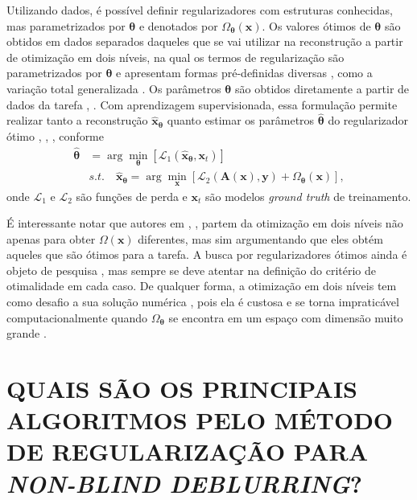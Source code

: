 Utilizando dados, é possível definir regularizadores com estruturas conhecidas, mas parametrizados por $\bm{\theta}$ e denotados por $\Omega_{\bm{\theta}}(\mathbf{x})$. Os valores ótimos de $\bm{\theta}$ são obtidos em dados separados daqueles que se vai utilizar na reconstrução a partir de otimização em dois níveis, na qual os termos de regularização são parametrizados por $\bm{\theta}$ e apresentam formas pré-definidas diversas \cite{Haber2003}, como a variação total generalizada \cite{DelosReyes2016}. Os parâmetros $\bm{\theta}$ são obtidos diretamente a partir de dados da tarefa \cite[pág. 45]{Arridge2019}, \cite{Haber2003}. Com aprendizagem supervisionada, essa formulação permite realizar tanto a reconstrução $\hat{\mathbf{x}}_{\bm{\theta}}$ quanto estimar os parâmetros $\hat{\bm{\theta}}$ do regularizador ótimo \cite[pág. 45-7]{Arridge2019}, \cite{Haber2003}, \cite{DelosReyes2016},  conforme
\begin{equation}
\begin{aligned}
\hat{\bm{\theta}}  & = \arg\min_{\bm{\theta}} \left[\mathcal{L}_1\left( \hat{\mathbf{x}}_{\bm{\theta}}, \mathbf{x}_t \right) \right]\\
& s.t. \quad \hat{\mathbf{x}}_{\bm{\theta}} = \arg\min_{\mathbf{x}} \left[ \mathcal{L}_2(\mathbf{A}(\mathbf{x}),\mathbf{y}) + \Omega_{\bm{\theta}}(\mathbf{x}) \right],
\end{aligned}
\label{eq:learning2}
\end{equation}
onde $ \mathcal{L}_1$ e $ \mathcal{L}_2$ são funções de perda e $\mathbf{x}_t$ são modelos \textit{ground truth} de treinamento. 

É interessante notar que autores em \cite{Haber2003}, \cite{DelosReyes2016}, partem da otimização em dois níveis não apenas para obter $\Omega(\mathbf{x})$ diferentes, mas sim argumentando que eles obtém aqueles que são ótimos para a tarefa. A busca por regularizadores ótimos ainda é objeto de pesquisa \cite{alberti2021learning, DelosReyes2016}, mas sempre se deve atentar na definição do critério de otimalidade em cada caso. De qualquer forma, a otimização em dois níveis tem como desafio a sua solução numérica \cite{Afkham2021}, pois ela é custosa e se torna impraticável computacionalmente quando $\Omega_{\bm{\theta}}$ se encontra em um espaço com dimensão muito grande \cite{Lunz2018}.



\newpage

\section{QUAIS SÃO OS PRINCIPAIS ALGORITMOS PELO MÉTODO DE REGULARIZAÇÃO PARA \textit{NON-BLIND DEBLURRING}?}\label{sec:de_nonblind}

